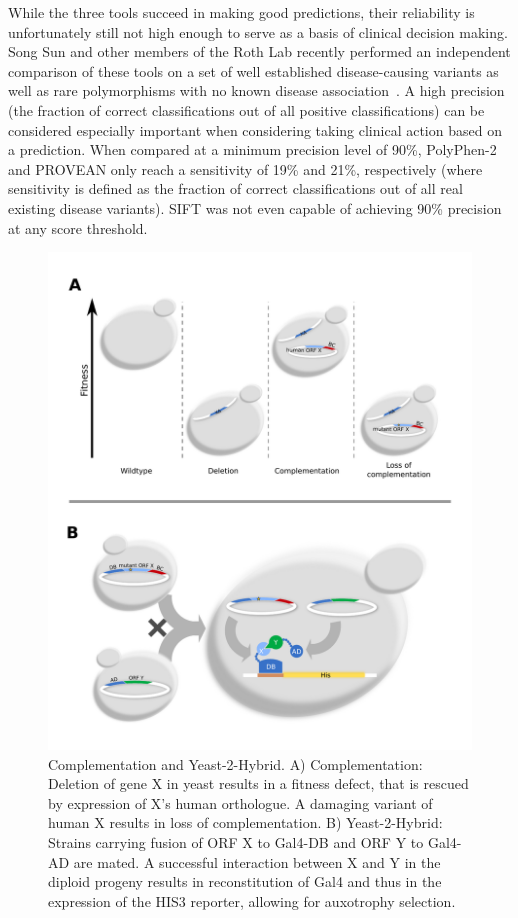 While the three tools succeed in making good predictions, their reliability is unfortunately still not high enough to serve as a basis of clinical decision making. Song Sun and other members of the Roth Lab recently performed an independent comparison of these tools on a set of well established disease-causing variants as well as rare polymorphisms with no known disease association~\cite{sun_extended_2016}. A high precision (the fraction of correct classifications out of all positive classifications) can be considered especially important when considering taking clinical action based on a prediction. When compared at a minimum precision level of 90\%, PolyPhen-2 and PROVEAN only reach a sensitivity of 19\% and 21\%, respectively (where sensitivity is defined as the fraction of correct classifications out of all real existing disease variants). SIFT was not even capable of achieving 90\% precision at any score threshold.

\begin{figure}[h!]
	\centering
	\includegraphics[width=\textwidth]{img/compl_y2h.pdf}
	\caption{Complementation and Yeast-2-Hybrid. A) Complementation: Deletion of gene X in yeast results in a fitness defect, that is rescued by expression of X's human orthologue. A damaging variant of human X results in loss of complementation. B) Yeast-2-Hybrid: Strains carrying fusion of ORF X to Gal4-DB and ORF Y to Gal4-AD are mated. A successful interaction between X and Y in the diploid progeny results in reconstitution of Gal4 and thus in the expression of the HIS3 reporter, allowing for auxotrophy selection.}
	\label{fig:compl_y2h}
\end{figure}

